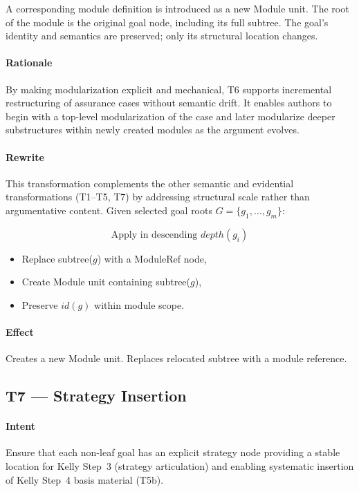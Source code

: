 \documentclass[12pt,twoside,a4paper]{article}
\begin{document}
A corresponding module definition is introduced as a new Module unit. The root of the module is the original goal node, including its full subtree. The goal’s identity and semantics are preserved; only its structural location changes.

\paragraph{Rationale}
By making modularization explicit and mechanical, T6 supports incremental restructuring of assurance cases without semantic drift. It enables authors to begin with a top-level modularization of the case and later modularize deeper substructures within newly created modules as the argument evolves.


\paragraph{Rewrite}
This transformation complements the other semantic and evidential transformations (T1–T5, T7) by addressing structural scale rather than argumentative content.
Given selected goal roots $G = \{g_1,\dots,g_m\}$:

\[
\text{Apply in descending } depth(g_i)
\]

\begin{itemize}
  \item Replace subtree($g$) with a ModuleRef node,
  \item Create Module unit containing subtree($g$),
  \item Preserve $id(g)$ within module scope.
\end{itemize}

\paragraph{Effect}
Creates a new Module unit. Replaces relocated subtree with a module reference.


\subsection{T7 --- Strategy Insertion}

\paragraph{Intent}
Ensure that each non-leaf goal has an explicit strategy node providing a stable location for Kelly Step~3 (strategy articulation) and enabling systematic insertion of Kelly Step~4 basis material (T5b).
\end{document}
